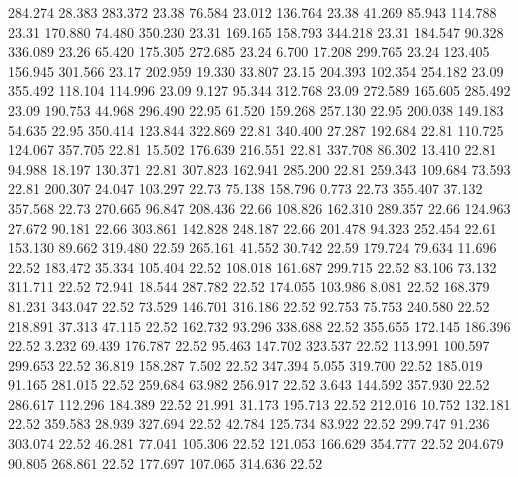  284.274   28.383  283.372        23.38
  76.584   23.012  136.764        23.38
  41.269   85.943  114.788        23.31
 170.880   74.480  350.230        23.31
 169.165  158.793  344.218        23.31
 184.547   90.328  336.089        23.26
  65.420  175.305  272.685        23.24
   6.700   17.208  299.765        23.24
 123.405  156.945  301.566        23.17
 202.959   19.330   33.807        23.15
 204.393  102.354  254.182        23.09
 355.492  118.104  114.996        23.09
   9.127   95.344  312.768        23.09
 272.589  165.605  285.492        23.09
 190.753   44.968  296.490        22.95
  61.520  159.268  257.130        22.95
 200.038  149.183   54.635        22.95
 350.414  123.844  322.869        22.81
 340.400   27.287  192.684        22.81
 110.725  124.067  357.705        22.81
  15.502  176.639  216.551        22.81
 337.708   86.302   13.410        22.81
  94.988   18.197  130.371        22.81
 307.823  162.941  285.200        22.81
 259.343  109.684   73.593        22.81
 200.307   24.047  103.297        22.73
  75.138  158.796    0.773        22.73
 355.407   37.132  357.568        22.73
 270.665   96.847  208.436        22.66
 108.826  162.310  289.357        22.66
 124.963   27.672   90.181        22.66
 303.861  142.828  248.187        22.66
 201.478   94.323  252.454        22.61
 153.130   89.662  319.480        22.59
 265.161   41.552   30.742        22.59
 179.724   79.634   11.696        22.52
 183.472   35.334  105.404        22.52
 108.018  161.687  299.715        22.52
  83.106   73.132  311.711        22.52
  72.941   18.544  287.782        22.52
 174.055  103.986    8.081        22.52
 168.379   81.231  343.047        22.52
  73.529  146.701  316.186        22.52
  92.753   75.753  240.580        22.52
 218.891   37.313   47.115        22.52
 162.732   93.296  338.688        22.52
 355.655  172.145  186.396        22.52
   3.232   69.439  176.787        22.52
  95.463  147.702  323.537        22.52
 113.991  100.597  299.653        22.52
  36.819  158.287    7.502        22.52
 347.394    5.055  319.700        22.52
 185.019   91.165  281.015        22.52
 259.684   63.982  256.917        22.52
   3.643  144.592  357.930        22.52
 286.617  112.296  184.389        22.52
  21.991   31.173  195.713        22.52
 212.016   10.752  132.181        22.52
 359.583   28.939  327.694        22.52
  42.784  125.734   83.922        22.52
 299.747   91.236  303.074        22.52
  46.281   77.041  105.306        22.52
 121.053  166.629  354.777        22.52
 204.679   90.805  268.861        22.52
 177.697  107.065  314.636        22.52
